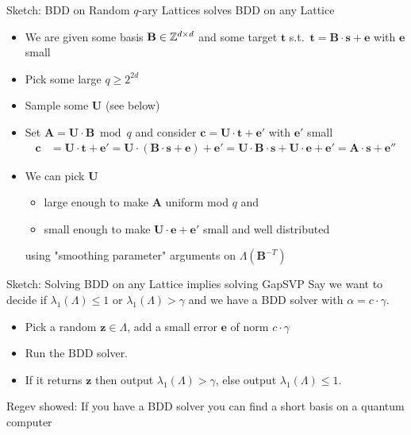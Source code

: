 \documentclass[xcolor=table,10pt,aspectratio=169]{beamer}
\renewcommand{\vec}[1]{\ensuremath{\mathbf{#1}}\xspace}
\newcommand{\mat}[1]{\ensuremath{\vec{#1}}\xspace}
\begin{document}
\begin{frame}[label={sec:org2ad245b}]{Sketch: BDD on Random \(q\)-ary Lattices solves BDD on any Lattice}
\begin{itemize}
\item We are given some basis \(\mat{B} \in \ZZ^{d \times d}\) and some target \(\vec{t}\) s.t. \(\vec{t} = \mat{B}\cdot \vec{s} + \vec{e}\) with \(\vec{e}\) small
\item Pick some large \(q \geq 2^{2d}\)
\item Sample some \(\mat{U}\) (see below)
\item Set \(\mat{A} = \mat{U}\cdot \mat{B} \bmod q\) and consider \(\vec{c} = \mat{U} \cdot \vec{t} + \vec{e}'\) with \({\vec{e}'}\) small
\begin{align*}
\vec{c} &= \mat{U} \cdot \vec{t} + \vec{e}' = \mat{U} \cdot \left(\mat{B}\cdot \vec{s} + \vec{e} \right) + \vec{e}' = \mat{U} \cdot \mat{B}\cdot \vec{s} + \mat{U} \cdot \vec{e} + \vec{e}' = \mat{A} \cdot \vec{s} + \vec{e}''
\end{align*}
\item We can pick \(\mat{U}\)
\begin{itemize}
\item large enough to make \(\mat{A}\) uniform mod \(q\) and
\item small enough to make \(\mat{U} \cdot \vec{e} + \vec{e}'\) small and well distributed
\end{itemize}
using "smoothing parameter" arguments on \(\Lambda(\mat{B}^{-T})\)
\end{itemize}

\end{frame}



\begin{frame}[label={sec:org63ea9b0}]{Sketch: Solving BDD on any Lattice implies solving GapSVP}
Say we want to decide if \(\lambda_{1}(\Lambda) \leq 1\) or \(\lambda_{1}(\Lambda) > \gamma\) and we have a BDD solver with \(\alpha = c\cdot \gamma\).

\begin{itemize}
\item Pick a random \(\vec{z} \in \Lambda\), add a small error \(\vec{e}\) of norm \(c\cdot \gamma\)
\item Run the BDD solver.
\item If it returns \(\vec{z}\) then output \(\lambda_{1}(\Lambda) > \gamma\), else output \(\lambda_{1}(\Lambda) \leq 1\).
\end{itemize}


\begin{block}{}
Regev showed: If you have a BDD solver you can find a short basis on a quantum computer

\end{block}
\end{frame}
\end{document}
